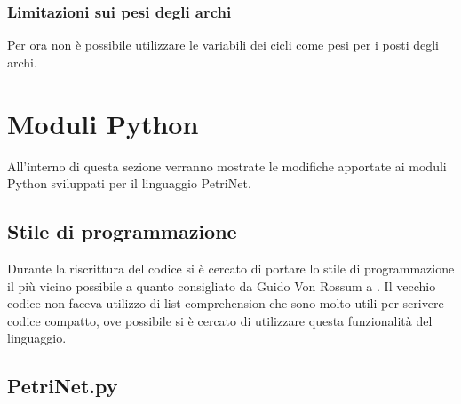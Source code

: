 \documentclass[italian,12pt]{book}
\begin{document}
\subsubsection{Limitazioni sui pesi degli archi}
Per ora non è possibile utilizzare le variabili dei cicli come 
pesi per i posti degli archi.





\section{Moduli Python}
All'interno di questa sezione verranno mostrate le modifiche apportate ai moduli Python sviluppati
per il linguaggio PetriNet.

\subsection{Stile di programmazione}
Durante la riscrittura del codice si è cercato di portare lo stile di programmazione il più vicino possibile 
a quanto consigliato da Guido Von Rossum a \cite{PYTHCODESTYLE}. Il vecchio codice non faceva utilizzo di 
list comprehension che sono molto utili per scrivere codice compatto, ove possibile si è cercato di utilizzare
questa funzionalità del linguaggio.

\subsection{PetriNet.py}
\end{document}
